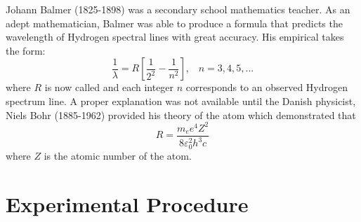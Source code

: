 \noindent Johann Balmer (1825-1898) was a secondary school mathematics teacher. As an adept mathematician, Balmer was able to produce a formula that predicts the wavelength of Hydrogen spectral lines with great accuracy. His empirical  takes the form: \begin{equation}\label{eq:SPEC2}
    \frac{1}{\lambda} = R\left[\frac{1}{2^2} - \frac{1}{n^2}\right],\;\;\;n=3,4,5,...
\end{equation}
where $R$ is now called  and each integer $n$ corresponds to an observed Hydrogen spectrum line. A proper explanation was not available until the Danish physicist, Niels Bohr (1885-1962) provided his theory of the atom which demonstrated that \begin{equation}\label{eq:SPEC3}
    R = \frac{m_ee^4Z^2}{8\varepsilon_0^2h^3c}
\end{equation}
where $Z$ is the atomic number of the atom.

\section{Experimental Procedure}

